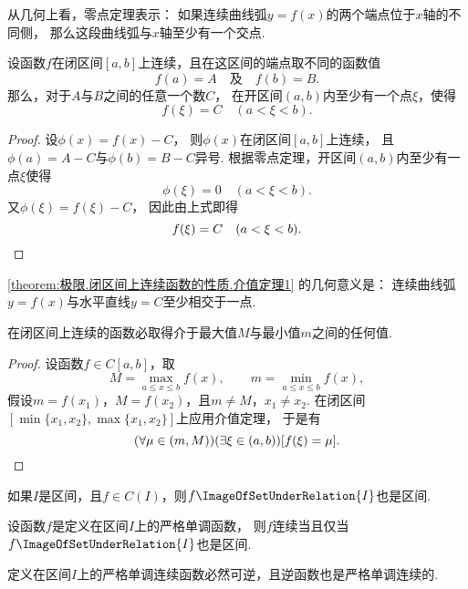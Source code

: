 从几何上看，零点定理表示：
如果连续曲线弧\(y = f(x)\)的两个端点位于\(x\)轴的不同侧，
那么这段曲线弧与\(x\)轴至少有一个交点.

\begin{theorem}[介值定理]\label{theorem:极限.闭区间上连续函数的性质.介值定理1}
设函数\(f\)在闭区间\([a,b]\)上连续，且在这区间的端点取不同的函数值\[
	f(a) = A
	\quad\text{及}\quad
	f(b) = B.
\]
那么，对于\(A\)与\(B\)之间的任意一个数\(C\)，
在开区间\((a,b)\)内至少有一个点\(\xi\)，使得\[
	f(\xi)=C
	\quad(a<\xi<b).
\]
\begin{proof}
设\(\phi(x)=f(x)-C\)，
则\(\phi(x)\)在闭区间\([a,b]\)上连续，
且\(\phi(a)=A-C\)与\(\phi(b)=B-C\)异号.
根据零点定理，开区间\((a,b)\)内至少有一点\(\xi\)使得\[
	\phi(\xi)=0
	\quad(a<\xi<b).
\]
又\(\phi(\xi)=f(\xi)-C\)，
因此由上式即得\[
	f(\xi)=C
	\quad(a<\xi<b).
	\qedhere
\]
\end{proof}
\end{theorem}
\cref{theorem:极限.闭区间上连续函数的性质.介值定理1} 的几何意义是：
连续曲线弧\(y=f(x)\)与水平直线\(y=C\)至少相交于一点.

\begin{corollary}\label{theorem:极限.闭区间上连续函数的性质.介值定理2}
在闭区间上连续的函数必取得介于最大值\(M\)与最小值\(m\)之间的任何值.
\begin{proof}
设函数\(f \in C[a,b]\)，取\[
	M=\max_{a \leq x \leq b} f(x), \qquad
	m=\min_{a \leq x \leq b} f(x),
\]
假设\(m=f(x_1)\)，\(M=f(x_2)\)，且\(m \neq M\)，\(x_1 \neq x_2\).
在闭区间\([\min\{x_1,x_2\},\max\{x_1,x_2\}]\)上应用介值定理，
于是有\[
	(\forall\mu\in(m,M))(\exists\xi\in(a,b))
	[f(\xi)=\mu].
	\qedhere
\]
\end{proof}
\end{corollary}

\begin{corollary}
如果\(I\)是区间，且\(f\in C(I)\)，则\(f\ImageOfSetUnderRelation{I}\)也是区间.
\end{corollary}

\begin{corollary}
设函数\(f\)是定义在区间\(I\)上的严格单调函数，
则\(f\)连续当且仅当\(f\ImageOfSetUnderRelation{I}\)也是区间.
\end{corollary}

\begin{corollary}
定义在区间\(I\)上的严格单调连续函数必然可逆，且逆函数也是严格单调连续的.
\end{corollary}

